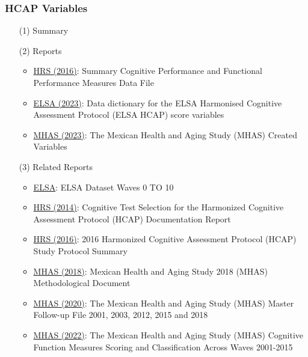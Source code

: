 \documentclass[12pt]{article}
\begin{document}
\subsubsection{HCAP Variables}
\begin{itemize}
    \item[(1)] Summary
    \item[(2)] Reports
    \begin{itemize}
        \item \href{https://hrs.isr.umich.edu/publications/biblio/9950}{HRS (2016)}: Summary Cognitive Performance and Functional Performance Measures Data File
        \item \href{https://www.elsa-project.ac.uk/study-documentation}{ELSA (2023)}: Data dictionary for the ELSA Harmonised Cognitive Assessment Protocol (ELSA HCAP) score variables
        \item \href{https://www.mhasweb.org/Documentation/ConstructedData.aspx}{MHAS (2023)}: The Mexican Health and Aging Study (MHAS) Created Variables
    \end{itemize}
    \item[(3)] Related Reports
    \begin{itemize}
        \item \href{https://www.elsa-project.ac.uk/the-data-we-collect}{ELSA}: ELSA Dataset Waves 0 TO 10
        \item \href{https://hrs.isr.umich.edu/publications/biblio/8517}{HRS (2014)}: Cognitive Test Selection for the Harmonized Cognitive Assessment Protocol (HCAP) Documentation Report
        \item \href{https://hrs.isr.umich.edu/publications/biblio/9950}{HRS (2016)}: 2016 Harmonized Cognitive Assessment Protocol (HCAP) Study Protocol Summary
        \item \href{https://www.mhasweb.org/Documentation/SurveyDesign.aspx}{MHAS (2018)}: Mexican Health and Aging Study 2018 (MHAS) Methodological Document
        \item \href{https://www.mhasweb.org/Documentation/DataDescriptions.aspx}{MHAS (2020)}: The Mexican Health and Aging Study (MHAS) Master Follow-up File 2001, 2003, 2012, 2015 and 2018
        \item \href{https://www.mhasweb.org/Documentation/ConstructedData.aspx}{MHAS (2022)}: The Mexican Health and Aging Study (MHAS) Cognitive Function Measures Scoring and Classification Across Waves 2001-2015
    \end{itemize}
\end{itemize}
\end{document}
